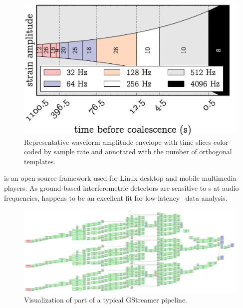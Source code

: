\documentclass[portrait,plainboxedsections]{sciposter}
\begin{document}
\begin{minipage}[t]{0.25\textwidth}
\begin{figure}
\includegraphics{figures/envelope}
\caption{\label{fig:time_slices} Representative waveform amplitude envelope with time slices color-coded by sample rate and annotated with the number of orthogonal templates.}
\end{figure}

{\setlength{\parindent}{1em}
\gstreamer{} is an open-source framework used for
Linux desktop and mobile multimedia players. As ground-based interferometric
detectors are sensitive to \GW{}s at audio frequencies, \gstreamer{} happens to be
an excellent fit for low-latency \LIGO\ data analysis.
}
%
\begin{figure}
\includegraphics[width=\textwidth]{figures/network}
\caption{\label{fig:gstreamer}Visualization of part of a typical GStreamer pipeline.}
\end{figure}

\end{minipage}
\end{document}
